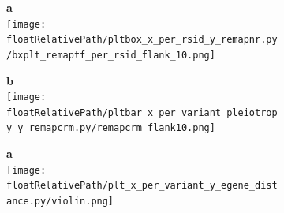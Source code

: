 %
%

\begin{figure}[h!]
    \centering
    \begin{subfigure}[]{.48\textwidth}
        \textbf{a}
        \\
        \texttt{[image: \\floatRelativePath/pltbox\_x\_per\_rsid\_y\_remapnr.py/bxplt\_remaptf\_per\_rsid\_flank\_10.png]}
    \end{subfigure}
    \begin{subfigure}[]{.48\textwidth}
        \textbf{b}
        \\
        \texttt{[image: \\floatRelativePath/pltbar\_x\_per\_variant\_pleiotropy\_y\_remapcrm.py/remapcrm\_flank10.png]}
    \end{subfigure}
    \caption{}
\end{figure}

%
%

\begin{figure}[h!]
    \centering
    \begin{subfigure}[]{.48\textwidth}
        \textbf{a}
        \\
        \texttt{[image: \\floatRelativePath/plt\_x\_per\_variant\_y\_egene\_distance.py/violin.png]}
    \end{subfigure}
    \caption{}
\end{figure}

